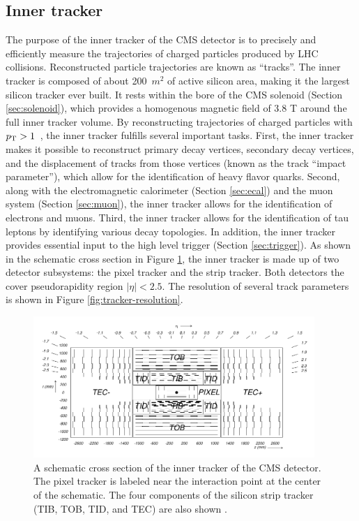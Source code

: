 \subsection{Inner tracker}
\label{sec:tracker}

The purpose of the inner tracker of the CMS detector
is to precisely and efficiently measure the trajectories
of charged particles produced by LHC collisions.
Reconstructed particle trajectories are known as ``tracks''.
The inner tracker is composed of about 200~$m^2$ of active silicon area, 
making it the largest silicon tracker ever built.
It rests within the bore of the 
CMS solenoid (Section \ref{sec:solenoid}), which
provides a homogenous magnetic field of 3.8 T around
the full inner tracker volume.  
By reconstructing trajectories of charged particles with 
$p_{\text{T}} > 1$~\GeV, the inner tracker fulfills several important tasks.
First, the inner tracker makes it possible to reconstruct primary decay vertices,
secondary decay vertices, and the displacement of tracks from those 
vertices (known as the track ``impact parameter''), which allow
for the identification of heavy flavor quarks.
Second, along with the electromagnetic calorimeter (Section \ref{sec:ecal}) and 
the muon system (Section \ref{sec:muon}), the inner tracker allows for the identification
of electrons and muons.  Third,
the inner tracker allows for the identification of tau leptons by identifying various decay topologies.
In addition, the inner tracker provides essential input to the high level trigger (Section \ref{sec:trigger}).
As shown in the schematic cross section in Figure \ref{fig:tracker}, the inner tracker is made up of two
detector subsystems: the pixel tracker and the strip tracker.  Both detectors the cover
pseudorapidity region $|\eta| < 2.5$.  The resolution of several track parameters is shown in Figure
\ref{fig:tracker-resolution}.

\begin{figure}
  \centering
  \includegraphics[width=0.95\textwidth]{tex/cms/fig/tracker-schematic.pdf}
  \caption{A schematic cross section of the inner tracker of the CMS detector.  The pixel tracker
    is labeled near the interaction point at the center of the schematic.
    The four components of the silicon strip tracker (TIB, TOB, TID, and TEC) are also shown  \cite{cms-jinst}.}
  \label{fig:tracker}
\end{figure}

